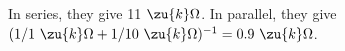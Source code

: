 In series, they give 11 $\zu{k}\Omega$. 
In parallel, they give $(1/1\ \zu{k}\Omega+1/10\ \zu{k}\Omega)^{-1} = 0.9\ \zu{k}\Omega$.



